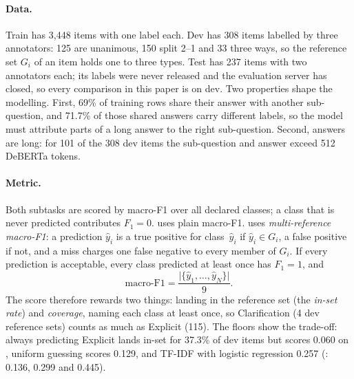\paragraph{Data.}
Train has 3,448 items with one label each.
Dev has 308 items labelled by three annotators: 125 are unanimous, 150 split 2--1 and 33 three ways, so the reference set $G_i$ of an item holds one to three types.
Test has 237 items with two annotators each; its labels were never released and the evaluation server has closed, so every comparison in this paper is on dev.
Two properties shape the modelling.
First, 69\% of training rows share their answer with another sub-question, and 71.7\% of those shared answers carry different labels, so the model must attribute parts of a long answer to the right sub-question.
Second, answers are long: for 101 of the 308 dev items the sub-question and answer exceed 512 DeBERTa tokens.

\paragraph{Metric.}
Both subtasks are scored by macro-F1 over all declared classes; a class that is never predicted contributes $F_1=0$.
\Sone{} uses plain macro-F1.
\Stwo{} uses \emph{multi-reference macro-F1}: a prediction $\hat{y}_i$ is a true positive for class~$\hat{y}_i$ if $\hat{y}_i \in G_i$, a false positive if not, and a miss charges one false negative to every member of $G_i$.
If every prediction is acceptable, every class predicted at least once has $F_1=1$, and
\begin{equation}
  \text{macro-F1} = \frac{\lvert\{\hat{y}_1,\dots,\hat{y}_N\}\rvert}{9} .
  \label{eq:task-coverage}
\end{equation}
The score therefore rewards two things: landing in the reference set (the \emph{in-set rate}) and \emph{coverage}, naming each class at least once, so Clarification (4 dev reference sets) counts as much as Explicit (115).
The floors show the trade-off: always predicting Explicit lands in-set for 37.3\% of dev items but scores 0.060 on \Stwo{}, uniform guessing scores 0.129, and TF-IDF with logistic regression 0.257 (\Sone{}: 0.136, 0.299 and 0.445).

